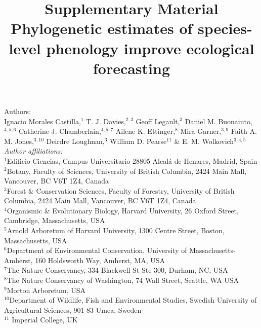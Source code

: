 \documentclass[11pt]{article}
\begin{document}



\title{Supplementary Material\\
Phylogenetic estimates of species-level phenology improve ecological forecasting}
\author{} %
\maketitle


\noindent Authors:\\
Ignacio Morales Castilla,$^{1}$ T. J. Davies,$^{2,3}$ Geoff Legault,$^{3}$ Daniel M. Buonaiuto,$^{4,5,6}$ Catherine J. Chamberlain,$^{4,5,7}$ Ailene K. Ettinger,$^{8}$ Mira Garner,$^{3,9}$ Faith A. M. Jones,$^{3,10}$ Deirdre Loughnan,$^{3}$ William D. Pearse$^{11}$ \& E. M. Wolkovich$^{3,4,5}$  \vspace{2ex}\\
\emph{Author affiliations:}\\
$^{1}$Edificio Ciencias, Campus Universitario 28805 Alcal\'a de Henares, Madrid, Spain\\
 $^{2}$Botany, Faculty of Sciences, University of British Columbia, 2424 Main Mall, Vancouver, BC V6T 1Z4, Canada\\
$^{3}$Forest \& Conservation Sciences, Faculty of Forestry, University of British Columbia, 2424 Main Mall, Vancouver, BC V6T 1Z4, Canada\\
$^{4}$Organismic \& Evolutionary Biology, Harvard University, 26 Oxford Street, Cambridge, Massachusetts, USA\\
$^{5}$Arnold Arboretum of Harvard University, 1300 Centre Street, Boston, Massachusetts, USA\\
$^{6}$Department of Environmental Conservation, University of Massachusetts-Amherst, 160 Holdsworth Way, Amherst, MA, USA\\  %
 $^{7}$The Nature Conservancy, 334 Blackwell St Ste 300, Durham, NC, USA \\ %
$^{8}$The Nature Conservancy of Washington, 74 Wall Street, Seattle, WA  USA \\ %
$^{9}$Morton Arboretum, USA  \\ 
$^{10}$Department of Wildlife, Fish and Environmental Studies, Swedish University of Agricultural Sciences, 901 83 Umea, Sweden\\ %
$^{11}$ Imperial College, UK\\
\end{document}
